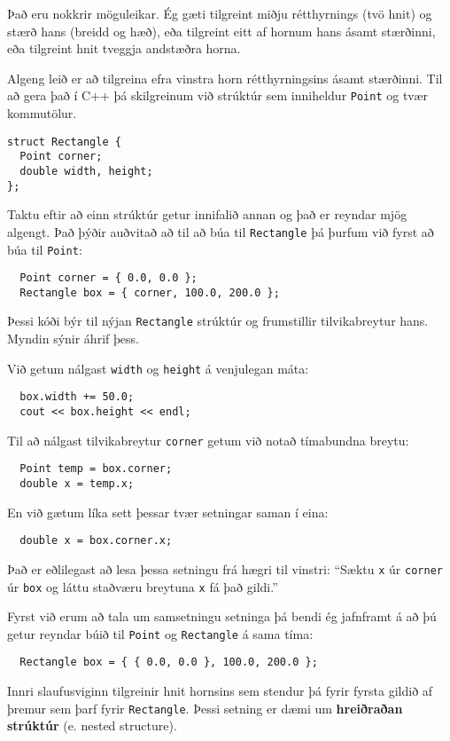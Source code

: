 Það eru nokkrir möguleikar.
Ég gæti tilgreint miðju rétthyrnings (tvö hnit) og stærð hans (breidd og hæð), eða tilgreint eitt af hornum hans ásamt stærðinni, eða tilgreint hnit tveggja andstæðra horna.

Algeng leið er að tilgreina efra vinstra horn rétthyrningsins ásamt stærðinni.
Til að gera það í C++ þá skilgreinum við strúktúr sem inniheldur {\tt Point} og tvær kommutölur.

\begin{verbatim}
struct Rectangle {
  Point corner;
  double width, height;
};  
\end{verbatim}
%
Taktu eftir að einn strúktúr getur innifalið annan og það er reyndar mjög algengt.
Það þýðir auðvitað að til að búa til {\tt Rectangle} þá þurfum við fyrst að búa til {\tt Point}:

\begin{verbatim}
  Point corner = { 0.0, 0.0 };
  Rectangle box = { corner, 100.0, 200.0 };
\end{verbatim}
%
Þessi kóði býr til nýjan {\tt Rectangle} strúktúr og frumstillir tilvikabreytur hans.
Myndin sýnir áhrif þess.

\vspace{0.1in}
\centerline{}
\vspace{0.1in}
%
Við getum nálgast {\tt width} og {\tt height} á venjulegan máta:

\begin{verbatim}
  box.width += 50.0;
  cout << box.height << endl;
\end{verbatim}
%
Til að nálgast tilvikabreytur {\tt corner} getum við notað tímabundna breytu:

\begin{verbatim}
  Point temp = box.corner;
  double x = temp.x;
\end{verbatim}
%
En við gætum líka sett þessar tvær setningar saman í eina:


\begin{verbatim}
  double x = box.corner.x;
\end{verbatim}
%
Það er eðlilegast að lesa þessa setningu frá hægri til vinstri: 
``Sæktu {\tt x} úr {\tt corner} úr {\tt box} og láttu staðværu breytuna {\tt x} fá það gildi.''

Fyrst við erum að tala um samsetningu setninga þá bendi ég jafnframt á að þú getur reyndar búið til {\tt Point} og {\tt Rectangle} á sama tíma:

\begin{verbatim}
  Rectangle box = { { 0.0, 0.0 }, 100.0, 200.0 };
\end{verbatim}
%
Innri slaufusviginn tilgreinir hnit hornsins sem stendur þá fyrir fyrsta gildið af þremur sem þarf fyrir {\tt Rectangle}.
Þessi setning er dæmi um {\bf hreiðraðan strúktúr} (e. nested structure).

